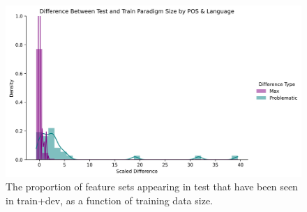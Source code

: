 \documentclass[11pt]{article}
\begin{document}
\begin{figure}
\centering
\includegraphics[width=\linewidth]{figs/percent_increase.png}
\caption{The proportion of feature sets appearing in test that have been seen in train+dev, as a function of training data size.}
\label{feats_attested}
\end{figure}

\newpage







%

%
%
\end{document}
